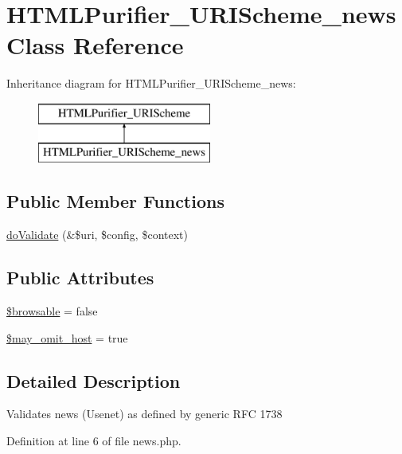 \hypertarget{classHTMLPurifier__URIScheme__news}{\section{H\+T\+M\+L\+Purifier\+\_\+\+U\+R\+I\+Scheme\+\_\+news Class Reference}
\label{classHTMLPurifier__URIScheme__news}
}
Inheritance diagram for H\+T\+M\+L\+Purifier\+\_\+\+U\+R\+I\+Scheme\+\_\+news\+:\begin{figure}[H]
\begin{center}
\leavevmode
\includegraphics[height=2.000000cm]{classHTMLPurifier__URIScheme__news}
\end{center}
\end{figure}
\subsection*{Public Member Functions}
\begin{DoxyCompactItemize}
\item 
\hyperlink{classHTMLPurifier__URIScheme__news_a1b02c7e3b200f2434b99c377728992cb}{do\+Validate} (\&\$uri, \$config, \$context)
\end{DoxyCompactItemize}
\subsection*{Public Attributes}
\begin{DoxyCompactItemize}
\item 
\hyperlink{classHTMLPurifier__URIScheme__news_aa365449a0dc311ed6c208b0b3f047114}{\$browsable} = false
\item 
\hyperlink{classHTMLPurifier__URIScheme__news_ade497fe02fe79224c6183b76917e5c1d}{\$may\+\_\+omit\+\_\+host} = true
\end{DoxyCompactItemize}


\subsection{Detailed Description}
Validates news (Usenet) as defined by generic R\+F\+C 1738 

Definition at line 6 of file news.\+php.



